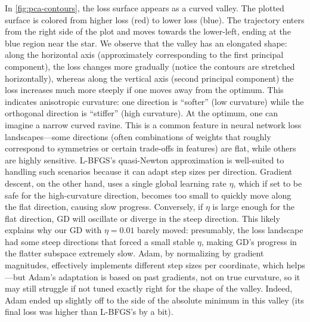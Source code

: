 \documentclass[12pt]{article}
\begin{document}
In \cref{fig:pca-contours}, the loss surface appears as a curved valley. The plotted surface is colored from higher loss (red) to lower loss (blue). The trajectory enters from the right side of the plot and moves towards the lower-left, ending at the blue region near the star. We observe that the valley has an elongated shape: along the horizontal axis (approximately corresponding to the first principal component), the loss changes more gradually (notice the contours are stretched horizontally), whereas along the vertical axis (second principal component) the loss increases much more steeply if one moves away from the optimum. This indicates anisotropic curvature: one direction is “softer” (low curvature) while the orthogonal direction is “stiffer” (high curvature). At the optimum, one can imagine a narrow curved ravine. This is a common feature in neural network loss landscapes—some directions (often combinations of weights that roughly correspond to symmetries or certain trade-offs in features) are flat, while others are highly sensitive. L-BFGS’s quasi-Newton approximation is well-suited to handling such scenarios because it can adapt step sizes per direction. Gradient descent, on the other hand, uses a single global learning rate $\eta$, which if set to be safe for the high-curvature direction, becomes too small to quickly move along the flat direction, causing slow progress. Conversely, if $\eta$ is large enough for the flat direction, GD will oscillate or diverge in the steep direction. This likely explains why our GD with $\eta=0.01$ barely moved: presumably, the loss landscape had some steep directions that forced a small stable $\eta$, making GD’s progress in the flatter subspace extremely slow. Adam, by normalizing by gradient magnitudes, effectively implements different step sizes per coordinate, which helps—but Adam’s adaptation is based on past gradients, not on true curvature, so it may still struggle if not tuned exactly right for the shape of the valley. Indeed, Adam ended up slightly off to the side of the absolute minimum in this valley (its final loss was higher than L-BFGS’s by a bit).
\end{document}

